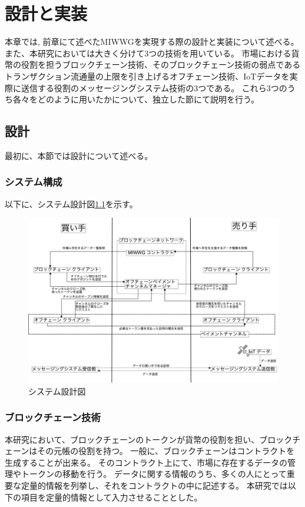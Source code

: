 \chapter{設計と実装}
本章では, 前章にて述べたMIWWGを実現する際の設計と実装について述べる。
また、本研究においては大きく分けて3つの技術を用いている。
市場における貨幣の役割を担うブロックチェーン技術、そのブロックチェーン技術の弱点であるトランザクション流通量の上限を引き上げるオフチェーン技術、IoTデータを実際に送信する役割のメッセージングシステム技術の3つである。
これら3つのうち各々をどのように用いたかについて、独立した節にて説明を行う。

\section{設計}
最初に、本節では設計について述べる。
\subsection{システム構成}
以下に、システム設計図\ref{SystemDesign}を示す。\\
\begin{figure}[htbp]
 \centering
  \includegraphics[width=160mm]{image/SystemDesign.png}
 \caption{システム設計図}
 \label{SystemDesign}
\end{figure}

\subsection{ブロックチェーン技術}
本研究において、ブロックチェーンのトークンが貨幣の役割を担い、ブロックチェーンはその元帳の役割を持つ。
一般に、ブロックチェーンはコントラクトを生成することが出来る。
そのコントラクト上にて、市場に存在するデータの管理やトークンの移動を行う。
データに関する情報のうち、多くの人にとって重要な定量的情報を列挙し、それをコントラクトの中に記述する。
本研究では以下の項目を定量的情報として入力させることとした。

